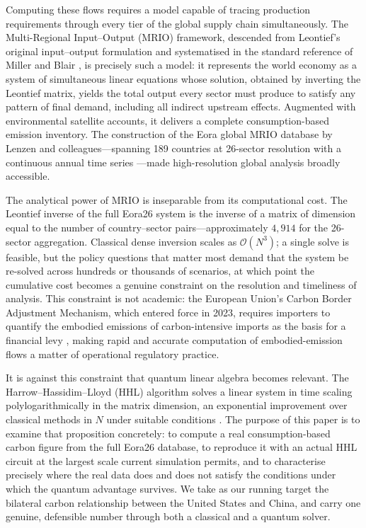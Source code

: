 \documentclass[letterpaper, 10 pt, conference]{ieeeconf}
\newcommand{\bigO}{\mathcal{O}}
\begin{document}
Computing these flows requires a model capable of tracing production requirements through every tier of the global supply chain simultaneously. The Multi-Regional Input--Output (MRIO) framework, descended from Leontief's original input--output formulation \cite{leontief1941} and systematised in the standard reference of Miller and Blair \cite{miller2009}, is precisely such a model: it represents the world economy as a system of simultaneous linear equations whose solution, obtained by inverting the Leontief matrix, yields the total output every sector must produce to satisfy any pattern of final demand, including all indirect upstream effects. Augmented with environmental satellite accounts, it delivers a complete consumption-based emission inventory. The construction of the Eora global MRIO database by Lenzen and colleagues---spanning 189 countries at 26-sector resolution with a continuous annual time series \cite{lenzen2012, lenzen2013}---made high-resolution global analysis broadly accessible.\par

The analytical power of MRIO is inseparable from its computational cost. The Leontief inverse of the full Eora26 system is the inverse of a matrix of dimension equal to the number of country--sector pairs---approximately $4{,}914$ for the 26-sector aggregation. Classical dense inversion scales as $\bigO(N^3)$; a single solve is feasible, but the policy questions that matter most demand that the system be re-solved across hundreds or thousands of scenarios, at which point the cumulative cost becomes a genuine constraint on the resolution and timeliness of analysis. This constraint is not academic: the European Union's Carbon Border Adjustment Mechanism, which entered force in 2023, requires importers to quantify the embodied emissions of carbon-intensive imports as the basis for a financial levy \cite{cbam2023}, making rapid and accurate computation of embodied-emission flows a matter of operational regulatory practice.\par

It is against this constraint that quantum linear algebra becomes relevant. The Harrow--Hassidim--Lloyd (HHL) algorithm solves a linear system in time scaling polylogarithmically in the matrix dimension, an exponential improvement over classical methods in $N$ under suitable conditions \cite{hhl2009}. The purpose of this paper is to examine that proposition concretely: to compute a real consumption-based carbon figure from the full Eora26 database, to reproduce it with an actual HHL circuit at the largest scale current simulation permits, and to characterise precisely where the real data does and does not satisfy the conditions under which the quantum advantage survives. We take as our running target the bilateral carbon relationship between the United States and China, and carry one genuine, defensible number through both a classical and a quantum solver.\par
\end{document}
